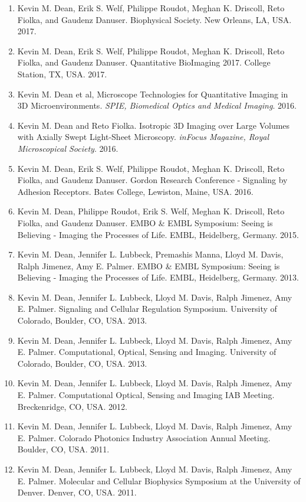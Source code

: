 \begin{enumerate}
\item Kevin M. Dean, Erik S. Welf, Philippe Roudot, Meghan K. Driscoll, Reto Fiolka, and Gaudenz Danuser.  Biophysical Society.  New Orleans, LA, USA. 2017.
\item Kevin M. Dean, Erik S. Welf, Philippe Roudot, Meghan K. Driscoll, Reto Fiolka, and Gaudenz Danuser.  Quantitative BioImaging 2017.  College Station, TX, USA. 2017.
\item Kevin M. Dean et al,  Microscope Technologies for Quantitative Imaging in 3D Microenvironments.  {\it SPIE, Biomedical Optics and Medical Imaging}.  2016.
\item Kevin M. Dean and Reto Fiolka. Isotropic 3D Imaging over Large Volumes with Axially Swept Light-Sheet Microscopy.  {\it inFocus Magazine, Royal Microscopical Society}.  2016.
\item Kevin M. Dean, Erik S. Welf, Philippe Roudot, Meghan K. Driscoll, Reto Fiolka, and Gaudenz Danuser.  Gordon Research Conference - Signaling by Adhesion Receptors.  Bates College, Lewiston, Maine, USA. 2016.
\item Kevin M. Dean, Philippe Roudot, Erik S. Welf, Meghan K. Driscoll, Reto Fiolka, and Gaudenz Danuser.  EMBO \& EMBL Symposium: Seeing is Believing - Imaging the Processes of Life.  EMBL, Heidelberg, Germany.  2015.
\item Kevin M. Dean, Jennifer L. Lubbeck, Premashis Manna, Lloyd M. Davis, Ralph Jimenez, Amy E. Palmer.  EMBO \& EMBL Symposium: Seeing is Believing - Imaging the Processes of Life.  EMBL, Heidelberg, Germany. 2013.
\item Kevin M. Dean, Jennifer L. Lubbeck, Lloyd M. Davis, Ralph Jimenez, Amy E. Palmer.  Signaling and Cellular Regulation Symposium.  University of Colorado, Boulder, CO, USA.  2013.
\item Kevin M. Dean, Jennifer L. Lubbeck, Lloyd M. Davis, Ralph Jimenez, Amy E. Palmer.  Computational, Optical, Sensing and Imaging.  University of Colorado, Boulder, CO, USA.  2013.
\item Kevin M. Dean, Jennifer L. Lubbeck, Lloyd M. Davis, Ralph Jimenez, Amy E. Palmer.  Computational Optical, Sensing and Imaging IAB Meeting.  Breckenridge, CO, USA.  2012.
\item Kevin M. Dean, Jennifer L. Lubbeck, Lloyd M. Davis, Ralph Jimenez, Amy E. Palmer.  Colorado Photonics Industry Association Annual Meeting.  Boulder, CO, USA. 2011.
\item Kevin M. Dean, Jennifer L. Lubbeck, Lloyd M. Davis, Ralph Jimenez, Amy E. Palmer.  Molecular and Cellular Biophysics Symposium at the University of Denver.  Denver, CO, USA. 2011.

\end{enumerate}
